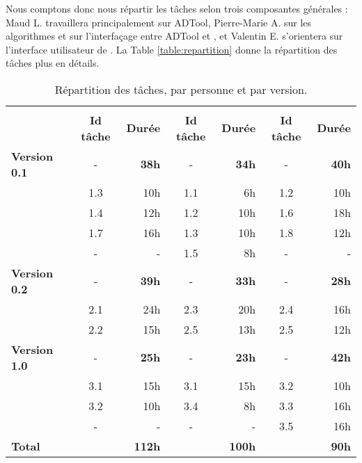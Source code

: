 		Nous comptons donc nous répartir les tâches selon trois composantes générales : Maud L. travaillera principalement sur ADTool, Pierre-Marie A. sur les algorithmes et sur l'interfaçage entre ADTool et \glasir{}, et Valentin E. s'orientera sur l'interface utilisateur de \glasir{}. La {\sc Table} \ref{table:repartition} donne la répartition des tâches plus en détails.
			


		\begin{table}[H]
			\centering
			\begin{tabular}{|l|c|r||c|r||c|r|}
				\hline
				\multirow{2}{*}{} & \nomRepart{Pierre-Marie A.} & \nomRepart{Valentin E.} & \nomRepartt{Maud L.}\\
				\cline{2-7}
				 & {\bf Id tâche} & {\bf Durée} & {\bf Id tâche} & {\bf Durée} & {\bf Id tâche} & {\bf Durée}\\
				\hline
				{\bf Version 0.1} & - & {\bf 38h} & - & {\bf 34h} & - & {\bf 40h}\\
				 & 1.3 & 10h & 1.1 & 6h & 1.2 & 10h\\
				 & 1.4 & 12h & 1.2 & 10h & 1.6 & 18h\\
				 & 1.7 & 16h & 1.3 & 10h & 1.8 & 12h\\
				 & - & - & 1.5 & 8h & - & -\\
				\hline
				{\bf Version 0.2} & - & {\bf 39h} & - & {\bf 33h} & - & {\bf 28h}\\
				 & 2.1 & 24h & 2.3 & 20h & 2.4 & 16h\\
				 & 2.2 & 15h & 2.5 & 13h & 2.5 & 12h\\
				\hline
				{\bf Version 1.0} & - & {\bf 25h} & - & {\bf 23h} & - & {\bf 42h}\\
				 & 3.1 & 15h & 3.1 & 15h & 3.2 & 10h\\
				 & 3.2 & 10h & 3.4 & 8h & 3.3 & 16h\\
				 & - & - & - & - & 3.5 & 16h\\
				\hline
				{\bf Total} & \multicolumn{2}{r||}{{\bf 112h}} & \multicolumn{2}{r||}{{\bf 100h}} & \multicolumn{2}{r|}{{\bf 90h}}\\
				\hline
			\end{tabular}
			\caption{Répartition des tâches, par personne et par version.}
			\label{table:repartition}
			\label{tab:repartition}
		\end{table}